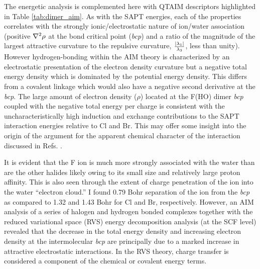 \begin{sie}
  The energetic analysis is complemented here with QTAIM descriptors highlighted in Table \ref{tab:dimer_aim}. As with the SAPT energies, each of the properties
  correlates with the strongly ionic/electrostatic nature of ion/water association (positive $\nabla^{\mathrm{2}}\rho$ at the bond critical point (\emph{bcp}) and a 
  ratio of the magnitude of the largest attractive curvature to the repulsive curvature, $\frac{\left|\lambda_{\mathrm{1}}\right|}{\lambda_{\mathrm{3}}}$, less than unity). 
  However hydrogen-bonding within the AIM theory is characterized by an electrostatic presentation of the electron density curvature but a negative total energy
  density which is dominated by the potential energy density. This differs from a covalent linkage which  would also have a negative second derivative at the 
  \emph{bcp}. The large amount of electron density ($\rho$) located at the F\sur{-}(HO) dimer \emph{bcp} coupled with the negative total energy per charge
  is consistent with the uncharacteristically high induction and exchange contributions to the SAPT interaction energies relative to Cl\sur{-} and Br\sur{-}. This
  may offer some insight into the origin of the argument for the apparent chemical character of the interaction discussed in Refs. 
  \cite{collins2007review,mccoy2006prywaterf}. 
  
  It is evident that the F\sur{-} ion is much more strongly associated with the water than are the other halides likely owing to its small size and relatively 
  large proton affinity\cite{kim2002bigall}. This is also seen through the extent of charge penetration of the ion into the water ``electron cloud.'' I found 0.79 
  Bohr separation of the ion from the \emph{bcp} as compared to 1.32 and 1.43 Bohr for Cl\sur{-} and Br\sur{-}, respectively. However, an AIM analysis of a series 
  of halogen and hydrogen bonded complexes together with the reduced variational space (RVS) energy decomposition analysis (at the SCF level) revealed that the 
  decrease in the total energy density and increasing electron density at the intermolecular \emph{bcp} are principally due to a marked increase in attractive
  electrostatic interactions\cite{angelina2013cov}. In the RVS theory, charge transfer is considered a component of the chemical or covalent energy terms.


\end{sie}
